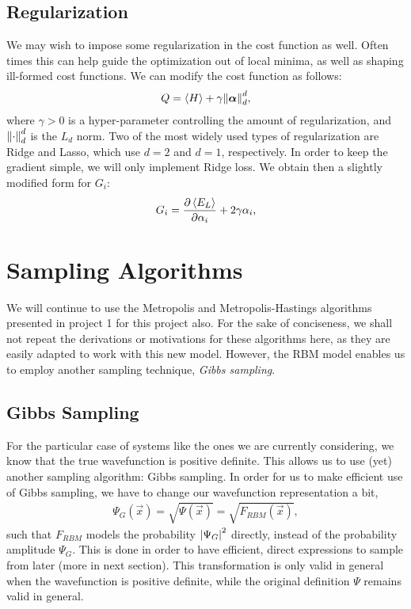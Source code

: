 \documentclass[a4paper, 11pt]{article}
\begin{document}
\begin{multicols}{2}
    
    \subsection{Regularization}

    We may wish to impose some regularization in the cost function as well.
    Often times this can help guide the optimization out of local minima, as
    well as shaping ill-formed cost functions. We can modify the cost function
    as follows:
    \begin{align}
        Q = \expval{H} + \gamma\norm{\bm \alpha}_d^d,
    \end{align} 
    where $\gamma>0$ is a hyper-parameter controlling the amount of
    regularization, and $\norm{\cdot}_d^d$ is the $L_d$ norm. Two of the most widely used
    types of regularization are Ridge and Lasso, which use $d=2$ and $d=1$,
    respectively. In order to keep the gradient simple, we will only implement
    Ridge loss. We obtain then a slightly modified form for $G_i$:
    \begin{align}
        G_i = \pdv{\expval{E_L}}{\alpha_i} +
        2\gamma\alpha_i,\label{eq:G-i-ridge}
    \end{align}

    \section{Sampling Algorithms}

    We will continue to use the Metropolis and Metropolis-Hastings algorithms
    presented in project 1 for this project also. For the sake of conciseness,
    we shall not repeat the derivations or motivations for these algorithms
    here, as they are easily adapted to work with this new model. However, the
    RBM model enables us to employ another sampling technique, \emph{Gibbs
    sampling}.

    \subsection{Gibbs Sampling}

    For the particular case of systems like the ones we are currently
    considering, we know that the true wavefunction is positive definite. This
    allows us to use (yet) another sampling algorithm: Gibbs sampling. In order
    for us to make efficient use of Gibbs sampling, we have to change our
    wavefunction representation a bit,
    \begin{align}
        \Psi_G(\vec x) = \sqrt{\Psi(\vec x)} = \sqrt{F_{RBM}(\vec
        x)}\label{eq:Psi-gibbs-def},
    \end{align}
    such that $F_{RBM}$ models the probability $\abs{\Psi_G}^2$ directly, instead
    of the probability amplitude $\Psi_G$. This is done in order to have
    efficient, direct expressions to sample from later (more in next section).
    This transformation is only valid in
    general when the wavefunction is positive definite, while the original
    definition $\Psi$ remains valid in general. 


\end{multicols}
\end{document}
